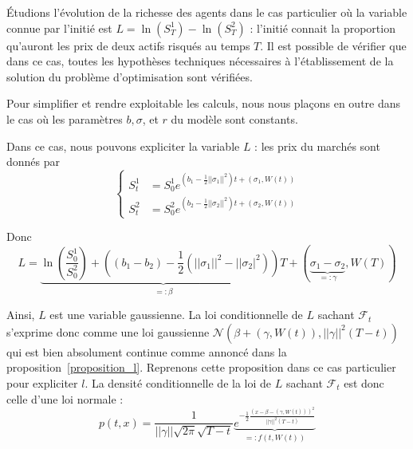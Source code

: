 \documentclass[../finalreport.tex]{subfiles}
\begin{document}
\par Étudions l'évolution de la richesse des agents dans le cas particulier où la variable connue par l'initié est $L = \ln \left( S_T^{1} \right) - \ln \left( S_T^{2} \right)$ : l'initié connait la proportion qu'auront les prix de deux actifs risqués au temps $T$. Il est possible de vérifier que dans ce cas, toutes les hypothèses techniques nécessaires à l'établissement de la solution du problème d'optimisation sont vérifiées.

\par Pour simplifier et rendre exploitable les calculs, nous nous plaçons en outre dans le cas où les paramètres $b, \sigma$, et $r$ du modèle sont constants.

\par Dans ce cas, nous pouvons expliciter la variable $L$ : les prix du marchés sont donnés par 
\begin{displaymath}
\begin{cases}
S_t^1 &= S_0^1 e^{ \left( b_1 - \frac{1}{2} ||\sigma_1||^2 \right) t + \left( \sigma_1, W \left( t \right) \right) }  \\
S_t^2 &= S_0^2 e^{ \left( b_2 - \frac{1}{2} ||\sigma_2||^2 \right) t + \left( \sigma_2, W \left( t \right) \right) }
\end{cases}
\end{displaymath}

\par Donc
\begin{displaymath}
L = \underbrace{\ln \left( \frac{S_0^1}{S_0^2} \right) + \left( \left( b_1 - b_2 \right) - \frac{1}{2} \left(||\sigma_1||^2 - ||\sigma_2|^2 \right) \right) T}_{=: \beta} + \left( \underbrace{\sigma_1 - \sigma_2}_{=: \gamma}, W \left( T \right) \right)
\end{displaymath}

\par Ainsi, $L$ est une variable gaussienne. La loi conditionnelle de $L$ sachant $\mathcal{F}_t$ s'exprime donc comme une loi gaussienne $\mathcal{N} \left( \beta + \left( \gamma, W \left( t \right) \right), ||\gamma||^2 \left( T - t \right) \right)$ qui est bien absolument continue comme annoncé dans la proposition~\ref{proposition_l}. Reprenons cette proposition dans ce cas particulier pour expliciter $l$. La densité conditionnelle de la loi de $L$ sachant $\mathcal{F}_t$ est donc celle d'une loi normale : 
\begin{displaymath}
p \left( t, x \right) = \frac{1}{ ||\gamma|| \sqrt{2 \pi} \sqrt{T - t}} \underbrace{e^{-\frac{1}{2} \frac{\left( x - \beta - \left( \gamma, W \left( t \right) \right) \right)^2}{||\gamma||^2 \left( T - t \right)}}}_{ =: f \left( t, W \left( t \right) \right)}
\end{displaymath}
\end{document}
